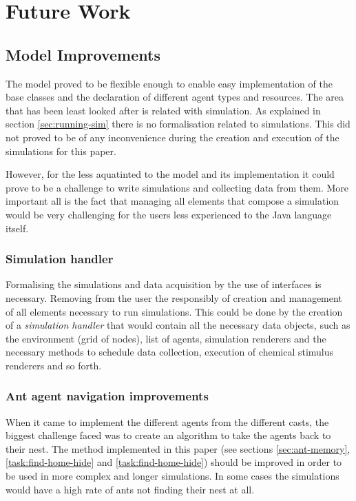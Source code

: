 \chapter{Future Work}
\label{ch:future-work}

\section{Model Improvements}

The model proved to be flexible enough to enable easy implementation of the base classes and the declaration of different agent types and resources. The area that has been least looked after is related with simulation. As explained in section \ref{sec:running-sim} there is no formalisation related to simulations. This did not proved to be of any  inconvenience during the creation and execution of the simulations for this paper. 

However, for the less aquatinted to the model and its implementation it could prove to be a challenge to write simulations and collecting data from them. More important all is the fact that managing all elements that compose a simulation would be very challenging for the users less experienced to the Java language itself.

\subsection{Simulation handler}

Formalising the simulations and data acquisition by the use of interfaces is necessary. Removing from the user the responsibly of creation and management of all elements necessary to run simulations. This could be done by the creation of a \emph{simulation handler} that would contain all the necessary data objects, such as the environment (grid of nodes), list of agents, simulation renderers and the necessary methods to schedule data collection, execution of chemical stimulus renderers and so forth.

\subsection{Ant agent navigation improvements}

When it came to implement the different agents from the different casts, the biggest challenge faced was to create an algorithm to take the agents back to their nest. The method implemented in this paper (see sections \ref{sec:ant-memory}, \ref{task:find-home-hide} and \ref{task:find-home-hide}) should be improved in order to be used in more complex and longer simulations. In some cases the simulations would have a high rate of ants not finding their nest at all.

